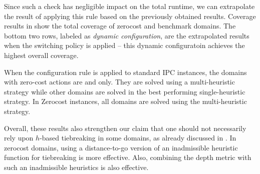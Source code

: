 Since such a check has negligible impact on the total runtime, we can extrapolate the result of applying this rule based on the previously obtained results.
Coverage results in  show the total coverage of
zerocost and benchmark domains. The bottom two rows, labeled as \emph{dynamic configuration},
are the extrapolated results when the switching policy is applied -- this dynamic configuratoin achieves the highest overall coverage.

\begin{table}[htbp]
 \centering 
 \caption{
 Summary Results: Coverage comparison, the total of IPC domains and Zerocost domains (the number of instances
 solved in 5min, 4GB) between several sorting strategies, plus a dynamic configuration strategy.  $[f,h,\fifo],
 [f,h,\ro], [f,\hh,\cdot], [f,h, \hh,\cdot], [f,\ffo,\cdot]$ are not shown because they achieve smaller coverage.
 }
 \label{tbl:dtg-summary-sum}
\end{table}

When the configuration rule is applied to standard IPC instances, the domains with zero-cost actions are  and  only. They are solved using a multi-heuristic strategy while other domains are solved in the best performing single-heuristic strategy. In Zerocost instances, all domains are solved using the multi-heuristic strategy.



Overall, these results also strengthen our claim that one should not necessarily rely upon $h$-based
tiebreaking in some
domains, as already discussed in . In zerocost domains,
using a distance-to-go version of an inadmissible heuristic function for
tiebreaking is more effective. Also, combining the depth metric with
such an inadmissible heuristics is also effective.

